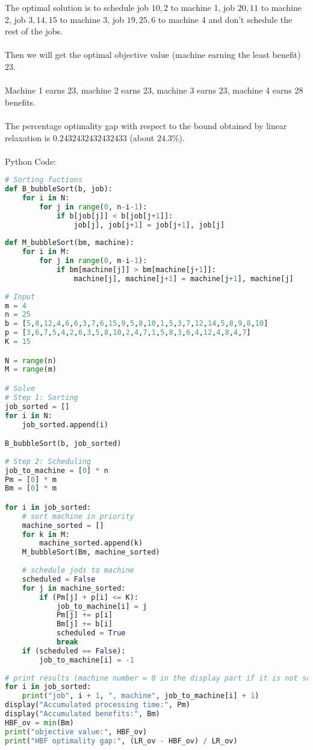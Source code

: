 \documentclass{article}
\begin{document}
The optimal solution is to schedule job $10, 2$ to machine 1, job $20, 11$ to machine 2, job $3, 14, 15$ to machine 3, job $19, 25, 6$ to machine 4 and don't schedule the rest of the jobs.
\\
\\Then we will get the optimal objective value (machine earning the least benefit) $23$.
\\
\\Machine 1 earns 23, machine 2 earns 23, machine 3 earns 23, machine 4 earns 28 benefits.
\\
\\The percentage optimality gap with respect to the bound obtained by linear relaxation is $0.2432432432432433$ (about $24.3\%$).
\\
\\Python Code:
\begin{lstlisting}[breaklines = true, language=Python]
# Sorting fuctions
def B_bubbleSort(b, job):
    for i in N:
        for j in range(0, n-i-1):
            if b[job[j]] < b[job[j+1]]:
                job[j], job[j+1] = job[j+1], job[j]
                
def M_bubbleSort(bm, machine):
    for i in M:
        for j in range(0, m-i-1):
            if bm[machine[j]] > bm[machine[j+1]]:
                machine[j], machine[j+1] = machine[j+1], machine[j]
                
# Input
m = 4
n = 25
b = [5,8,12,4,6,6,3,7,6,15,9,5,8,10,1,5,3,7,12,14,5,8,9,8,10]
p = [3,6,7,5,4,2,6,3,5,8,10,2,4,7,1,5,8,3,6,4,12,4,8,4,7]
K = 15

N = range(n)
M = range(m)

# Solve
# Step 1: Sorting
job_sorted = []
for i in N:
    job_sorted.append(i)

B_bubbleSort(b, job_sorted)
    
# Step 2: Scheduling
job_to_machine = [0] * n
Pm = [0] * m
Bm = [0] * m

for i in job_sorted:
    # sort machine in priority
    machine_sorted = []
    for k in M:
        machine_sorted.append(k)
    M_bubbleSort(Bm, machine_sorted)
    
    # schedule jods to machine
    scheduled = False
    for j in machine_sorted:
        if (Pm[j] + p[i] <= K):
            job_to_machine[i] = j
            Pm[j] += p[i]
            Bm[j] += b[i]
            scheduled = True
            break         
    if (scheduled == False):
        job_to_machine[i] = -1
        
# print results (machine number = 0 in the display part if it is not scheduled)
for i in job_sorted:
    print("job", i + 1, ", machine", job_to_machine[i] + 1)
display("Accumulated processing time:", Pm)
display("Accumulated benefits:", Bm)
HBF_ov = min(Bm)
print("objective value:", HBF_ov)
print("HBF optimality gap:", (LR_ov - HBF_ov) / LR_ov)
\end{lstlisting}
\end{document}
